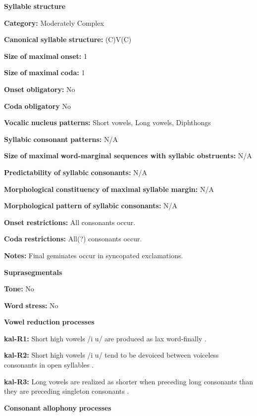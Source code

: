 \textbf{Syllable} \textbf{structure}

\textbf{Category:} Moderately Complex

\textbf{Canonical} \textbf{syllable} \textbf{structure:} (C)V(C) \citep[338-9]{Fortescue1984}

\textbf{Size} \textbf{of} \textbf{maximal} \textbf{onset:} 1

\textbf{Size} \textbf{of} \textbf{maximal} \textbf{coda:} 1

\textbf{Onset} \textbf{obligatory:} No

\textbf{Coda} \textbf{obligatory} No

\textbf{Vocalic} \textbf{nucleus} \textbf{patterns:} Short vowels, Long vowels, Diphthongs

\textbf{Syllabic} \textbf{consonant} \textbf{patterns:} N/A

\textbf{Size} \textbf{of} \textbf{maximal} \textbf{word{}-marginal sequences with syllabic obstruents:} N/A

\textbf{Predictability} \textbf{of} \textbf{syllabic} \textbf{consonants:} N/A

\textbf{Morphological} \textbf{constituency} \textbf{of} \textbf{maximal} \textbf{syllable} \textbf{margin:} N/A

\textbf{Morphological} \textbf{pattern} \textbf{of} \textbf{syllabic} \textbf{consonants:} N/A

\textbf{Onset} \textbf{restrictions:} All consonants occur.

\textbf{Coda} \textbf{restrictions:} All(?) consonants occur.

\textbf{Notes:} Final geminates occur in syncopated exclamations.

\textbf{Suprasegmentals}

\textbf{Tone:} No

\textbf{Word} \textbf{stress:} No

\textbf{Vowel} \textbf{reduction} \textbf{processes}

\textbf{kal-R1:}  Short high vowels /i u/ are produced as lax word-finally \citep[56-63]{Hagerup2011}.

\textbf{kal-R2:} Short high vowels /i u/ tend to be devoiced between voiceless consonants in open syllables \citep[335]{Fortescue1984}.

\textbf{kal-R3:} Long vowels are realized as shorter when preceding long consonants than they are preceding singleton consonants \citep[65]{Jacobsen2000}.

\textbf{Consonant} \textbf{allophony} \textbf{processes}

